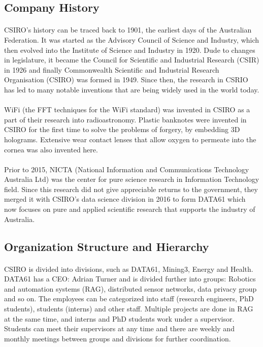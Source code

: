 \subsection{Company History}

\paragraph{}
CSIRO's history can be traced back to 1901, the earliest days of the Australian Federation. It was started as the Advisory Council of Science and Industry, which then evolved into the Institute of Science and Industry in 1920. Dude to changes in legislature, it became the Council for Scientific and Industrial Research (CSIR) in 1926 and finally Commonwealth Scientific and Industrial Research Organisation (CSIRO) was formed in 1949. Since then, the research in CSRIO has led to many notable inventions that are being widely used in the world today.

\paragraph{}
WiFi (the FFT techniques for the WiFi standard) was invented in CSIRO as a part of their research into radioastronomy. Plastic banknotes were invented in CSIRO for the first time to solve the problems of forgery, by embedding 3D holograms. Extensive wear contact lenses that allow oxygen to permeate into the cornea was also invented here. 

\paragraph{}
Prior to 2015, NICTA (National Information and Communications Technology Australia Ltd) was the center for pure science research in Information Technology field. Since this research did not give appreciable returns to the government, they merged it with CSIRO's data science division in 2016 to form DATA61 which now focuses on pure and applied scientific research that supports the industry of Australia.

\subsection{Organization Structure and Hierarchy}

\paragraph{}
CSIRO is divided into divisions, such as DATA61, Mining3, Energy and Health. DATA61 has a CEO: Adrian Turner and is divided further into groups: Robotics and automation systems (RAG), distributed sensor networks, data privacy group and so on. The employees can be categorized into staff (research engineers, PhD students), students (interns) and other staff. Multiple projects are done in RAG at the same time, and interns and PhD students work under a supervisor. Students can meet their supervisors at any time and there are weekly and monthly meetings between groups and divisions for further coordination.

